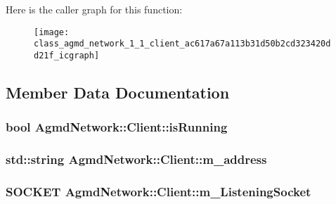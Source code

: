 Here is the caller graph for this function\+:\nopagebreak
\begin{figure}[H]
\begin{center}
\leavevmode
\texttt{[image: class\_agmd\_network\_1\_1\_client\_ac617a67a113b31d50b2cd323420dd21f\_icgraph]}
\end{center}
\end{figure}




\subsection{Member Data Documentation}
\hypertarget{class_agmd_network_1_1_client_af4624c8cadd334df5d7da75e0615ca48}{
\subsubsection[{is\+Running}]{\setlength{\rightskip}{0pt plus 5cm}bool Agmd\+Network\+::\+Client\+::is\+Running\hspace{0.3cm}{\ttfamily [protected]}}}\label{class_agmd_network_1_1_client_af4624c8cadd334df5d7da75e0615ca48}
\hypertarget{class_agmd_network_1_1_client_a8488fd2d5310cdb60d2803aeb00ac700}{
\subsubsection[{m\+\_\+address}]{\setlength{\rightskip}{0pt plus 5cm}std\+::string Agmd\+Network\+::\+Client\+::m\+\_\+address\hspace{0.3cm}{\ttfamily [protected]}}}\label{class_agmd_network_1_1_client_a8488fd2d5310cdb60d2803aeb00ac700}
\hypertarget{class_agmd_network_1_1_client_a407549403b21e2ecd628f9ac57eebcc0}{
\subsubsection[{m\+\_\+\+Listening\+Socket}]{\setlength{\rightskip}{0pt plus 5cm}S\+O\+C\+K\+E\+T Agmd\+Network\+::\+Client\+::m\+\_\+\+Listening\+Socket\hspace{0.3cm}{\ttfamily [protected]}}}\label{class_agmd_network_1_1_client_a407549403b21e2ecd628f9ac57eebcc0}
